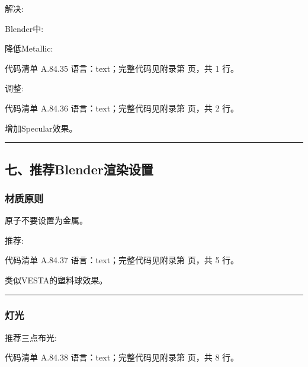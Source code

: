 \documentclass[lang=cn,scheme=chinese,color=blue,device=normal,toc=onecol,math=cm]{elegantbook}
\begin{document}
解决:\par


Blender中:\par


降低Metallic:\par


\begin{codeindexbox}{代码清单 A.84.35}
语言：text；完整代码见附录第 \pageref{code:84:35} 页，共 1 行。
\end{codeindexbox}


调整:\par


\begin{codeindexbox}{代码清单 A.84.36}
语言：text；完整代码见附录第 \pageref{code:84:36} 页，共 2 行。
\end{codeindexbox}


增加Specular效果。\par


\medskip\hrule\medskip


\subsection{七、推荐Blender渲染设置}


\subsubsection{材质原则}


原子不要设置为金属。\par


推荐:\par


\begin{codeindexbox}{代码清单 A.84.37}
语言：text；完整代码见附录第 \pageref{code:84:37} 页，共 5 行。
\end{codeindexbox}


类似VESTA的塑料球效果。\par


\medskip\hrule\medskip


\subsubsection{灯光}


推荐三点布光:\par


\begin{codeindexbox}{代码清单 A.84.38}
语言：text；完整代码见附录第 \pageref{code:84:38} 页，共 8 行。
\end{codeindexbox}
\end{document}
